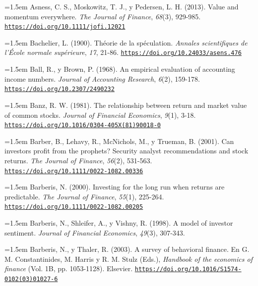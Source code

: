 \documentclass[10pt,a4paper]{article}
\begin{document}
\noindent\hangindent=1.5em Asness, C. S., Moskowitz, T. J., y Pedersen, L. H. (2013). Value and momentum everywhere. \textit{The Journal of Finance}, \textit{68}(3), 929-985. \href{https://doi.org/10.1111/jofi.12021}{\nolinkurl{https://doi.org/10.1111/jofi.12021}}

\noindent\hangindent=1.5em Bachelier, L. (1900). Théorie de la spéculation. \textit{Annales scientifiques de l'École normale supérieure}, \textit{17}, 21-86. \href{https://doi.org/10.24033/asens.476}{\nolinkurl{https://doi.org/10.24033/asens.476}}

\noindent\hangindent=1.5em Ball, R., y Brown, P. (1968). An empirical evaluation of accounting income numbers. \textit{Journal of Accounting Research}, \textit{6}(2), 159-178. \href{https://doi.org/10.2307/2490232}{\nolinkurl{https://doi.org/10.2307/2490232}}

\noindent\hangindent=1.5em Banz, R. W. (1981). The relationship between return and market value of common stocks. \textit{Journal of Financial Economics}, \textit{9}(1), 3-18. \href{https://doi.org/10.1016/0304-405X(81)90018-0}{\nolinkurl{https://doi.org/10.1016/0304-405X(81)90018-0}}

{\sloppy\noindent\hangindent=1.5em Barber, B., Lehavy, R., McNichols, M., y Trueman, B. (2001). Can investors profit from the prophets? Security analyst recommendations and stock returns. \textit{The Journal of Finance}, \textit{56}(2), 531-563. \href{https://doi.org/10.1111/0022-1082.00336}{\nolinkurl{https://doi.org/10.1111/0022-1082.00336}}\par}

\noindent\hangindent=1.5em Barberis, N. (2000). Investing for the long run when returns are predictable. \textit{The Journal of Finance}, \textit{55}(1), 225-264. \href{https://doi.org/10.1111/0022-1082.00205}{\nolinkurl{https://doi.org/10.1111/0022-1082.00205}}

\noindent\hangindent=1.5em Barberis, N., Shleifer, A., y Vishny, R. (1998). A model of investor sentiment. \textit{Journal of Financial Economics}, \textit{49}(3), 307-343.

{\sloppy\noindent\hangindent=1.5em Barberis, N., y Thaler, R. (2003). A survey of behavioral finance. En G. M. Constantinides, M. Harris y R. M. Stulz (Eds.), \textit{Handbook of the economics of finance} (Vol. 1B, pp. 1053-1128). Elsevier. \href{https://doi.org/10.1016/S1574-0102(03)01027-6}{\nolinkurl{https://doi.org/10.1016/S1574-0102(03)01027-6}}\par}
\end{document}
